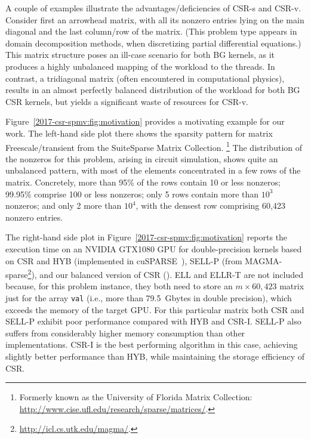 A couple of examples illustrate the advantages/deficiencies
of CSR-s and CSR-v.
Consider first an arrowhead matrix,
with all its nonzero entries lying on the main diagonal
and the last column/row of the matrix.
(This problem type appears in domain decomposition methods,
when discretizing partial differential equations.)
This matrix structure poses an ill-case scenario for both BG kernels,
as it produces a highly unbalanced mapping of the workload to the threads.
In contrast, a tridiagonal matrix
(often encountered in computational physics),
results in an almost perfectly balanced distribution
of the workload for both BG CSR kernels,
but yields a significant waste of resources for CSR-v.

Figure~\ref{2017-csr-spmv:fig:motivation} provides a motivating example for our work.
The left-hand side plot there shows the sparsity pattern for matrix
{\sc Freescale/transient} from the SuiteSparse Matrix Collection.%
\footnote{Formerly known as the University of Florida Matrix Collection:
\mbox{\url{http://www.cise.ufl.edu/research/sparse/matrices/}}.}
The distribution of the nonzeros for this problem,
arising in circuit simulation, shows quite an unbalanced pattern,
with most of the elements concentrated in a few rows of the matrix.
Concretely, more than 95\% of the rows contain 10 or less nonzeros;
99.95\% comprise 100 or less nonzeros;
only 5 rows contain more than $10^3$ nonzeros; and only 2 more than $10^4$,
with the densest row comprising
60,423 nonzero entries.

The right-hand side plot in Figure~\ref{2017-csr-spmv:fig:motivation}
reports the execution time on an NVIDIA GTX1080 GPU
for double-precision \spmv kernels based on CSR and HYB
(implemented in cuSPARSE~\cite{cusparse}),
SELL-P (from MAGMA-sparse\footnote{
\mbox{\url{http://icl.cs.utk.edu/magma/}}.}),
and our balanced version of CSR (\bcsr).
ELL and ELLR-T are not included because,
for this problem instance, they both need to store an
$m \times 60,423$ matrix just for the array {\tt val}
(i.e., more than 79.5~Gbytes in double precision),
which exceeds the memory of the target GPU.
For this particular matrix both CSR and SELL-P exhibit poor performance
compared with HYB and CSR-I. SELL-P also suffers
from considerably higher memory consumption than other implementations.
CSR-I is the best performing algorithm in this case,
achieving slightly better performance than HYB,
while maintaining the storage efficiency of CSR.

